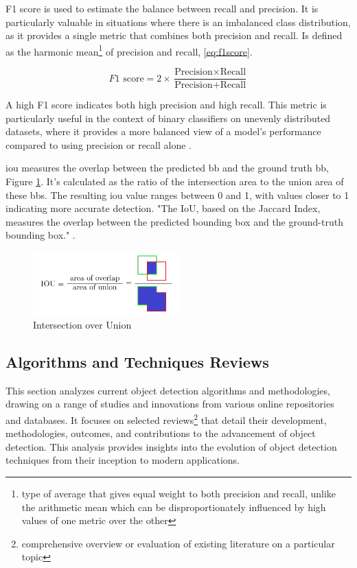 F1 score is used to estimate the balance between recall and precision. It is particularly valuable in situations where there is an imbalanced class distribution, as it provides a single metric that combines both precision and recall. Is defined as the harmonic mean\footnote{type of average that gives equal weight to both precision and recall, unlike the arithmetic mean which can be disproportionately influenced by high values of one metric over the other} of precision and recall, \ref{eq:f1score}. 

\begin{equation}
    F1 \text{ score} = 2 \times \frac{\text{Precision} \times \text{Recall}}{\text{Precision} + \text{Recall}}
    \label{eq:f1score}
\end{equation}
    
A high F1 score indicates both high precision and high recall. This metric is particularly useful in the context of binary classifiers on unevenly distributed datasets, where it provides a more balanced view of a model's performance compared to using precision or recall alone \cite{rfc9}.

\ac{iou} measures the overlap between the predicted \ac{bb} and the ground truth \ac{bb}, Figure \ref{fig:iou}. It's calculated as the ratio of the intersection area to the union area of these \ac{bb}s. The resulting \ac{iou} value ranges between 0 and 1, with values closer to 1 indicating more accurate detection. "The IoU, based on the Jaccard Index, measures the overlap between the predicted bounding box and the ground-truth bounding box." \cite{rfc24}.

\begin{figure}[h]
    \centering 
    \includegraphics[width=0.5\textwidth]{figs/iou.png} 
    \caption{Intersection over Union \cite{rfc25}}
    \label{fig:iou}
\end{figure}

\subsection{Algorithms and Techniques Reviews}
This section analyzes current object detection algorithms and methodologies, drawing on a range of studies and 
innovations from various online repositories and databases. It focuses on selected 
reviews\footnote{comprehensive overview or evaluation of existing literature on a particular topic} 
that detail their development, methodologies, outcomes, and contributions to the advancement of object 
detection. This analysis provides insights into the evolution of object detection techniques from their 
inception to modern applications.

